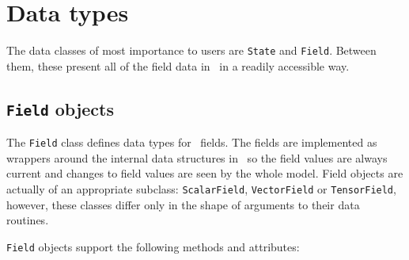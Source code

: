 \section{Data types}

The data classes of most importance to users are
\lstinline[language=Python]+State+ and
\lstinline[language=Python]+Field+. Between them, these present all of the
field data in \fluidity\ in a readily accessible way.

\subsection{\lstinline[language=Python]+Field+ objects}

The \lstinline[language=Python]+Field+ class defines data types for
\fluidity\ fields. The fields are implemented as wrappers around the
internal data structures in \fluidity\ so the field values are always
current and changes to field values are seen by the whole model. Field
objects are actually of an appropriate subclass:
\lstinline[language=Python]+ScalarField+,
\lstinline[language=Python]+VectorField+ or
\lstinline[language=Python]+TensorField+, however, these classes differ only
in the shape of arguments to their data routines.

\lstinline+Field+ objects support the following methods and attributes:

